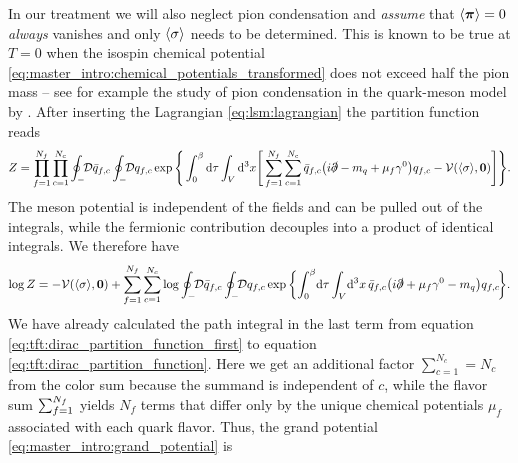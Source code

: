In our treatment we will also neglect pion condensation and \emph{assume} that $\langle {\bm{\pi}} \rangle=0$ \emph{always} vanishes
and only $\langle \sigma \rangle$ needs to be determined.
This is known to be true at $T=0$ when the isospin chemical potential \eqref{eq:master_intro:chemical_potentials_transformed} does not exceed half the pion mass
-- see for example the study of pion condensation in the quark-meson model by \cite{ref:jo_lsm_consistent,ref:jo_lsm_pion_condensation}.
After inserting the Lagrangian \eqref{eq:lsm:lagrangian} the partition function reads
\begin{equation}
	Z = \prod_{f=1}^{\smash{N_f}} \prod_{c=1}^{\smash{N_c}} \oint_- \!\! \mathcal{D} \bar{q}_{f,c} \oint_- \!\! \mathcal{D} q_{f,c} \exp \Bigg\{ \int_0^{\beta} \mathop{}\!\mathrm{d} \tau \int_V \mathop{}\!\mathrm{d}^3 x \Bigg[ \sum_{f=1}^{\smash{N_f}} \sum_{c=1}^{N_c} \bar{q}_{f,c} \big( i \slashed\partial - m_q + \mu_f \gamma^0 \big) q_{f,c} - \mathcal{V}(\langle \sigma \rangle,{\bm{0}}) \Bigg] \Bigg\}.
\end{equation}
The meson potential is independent of the fields and can be pulled out of the integrals,
while the fermionic contribution decouples into a product of identical integrals.
We therefore have
\begin{equation}
\begin{split}
	\log Z = -\pot(\avg{\sigma},\vec{0}) + \sum_{f=1}^{N_f} \sum_{c=1}^{N_c} \log \oint_- \!\! \pathintdif \bar{q}_{f,c} \oint_- \!\! \pathintdif q_{f,c} \exp \bigg\{ \! \int_0^\beta \! \dif \tau \int_V \! \dif^3 x \, \bar{q}_{f,c} \big(i \slashed\partial + \mu_f \gamma^0 - m_q\big) q_{f,c} \! \bigg\} .
\end{split}
\end{equation}
We have already calculated the path integral in the last term
from equation \eqref{eq:tft:dirac_partition_function_first} to equation \eqref{eq:tft:dirac_partition_function}.
Here we get an additional factor $\sum_{c=1}^{N_c} = N_c$ from the color sum because the summand is independent of $c$,
while the flavor sum $\sum_{f=1}^{\smash{N_f}}$ yields $N_f$ terms that differ only by the unique chemical potentials $\mu_f$ associated with each quark flavor. 
Thus, the grand potential \eqref{eq:master_intro:grand_potential} is
